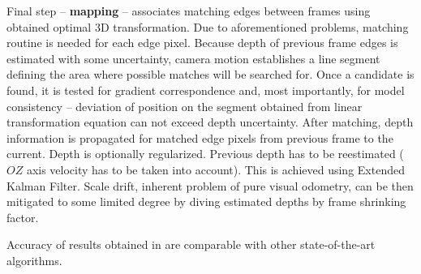 Final step -- \textbf{mapping} -- associates matching edges between frames using obtained optimal 3D transformation. Due to aforementioned problems, matching routine is needed for each edge pixel. Because depth of previous frame edges is estimated with some uncertainty, camera motion establishes a line segment defining the area where possible matches will be searched for. Once a candidate is found, it is tested for gradient correspondence and, most importantly, for model consistency -- deviation of position on the segment obtained from linear transformation equation can not exceed depth uncertainty. After matching, depth information is propagated for matched edge pixels from previous frame to the current. Depth is optionally regularized. Previous depth has to be reestimated ($OZ$ axis velocity has to be taken into account). This is achieved using Extended Kalman Filter. Scale drift, inherent problem of pure visual odometry, can be then mitigated to some limited degree by diving estimated depths by frame shrinking factor.

Accuracy of results obtained in \cite{jose2015realtime} are comparable with other state-of-the-art algorithms.


